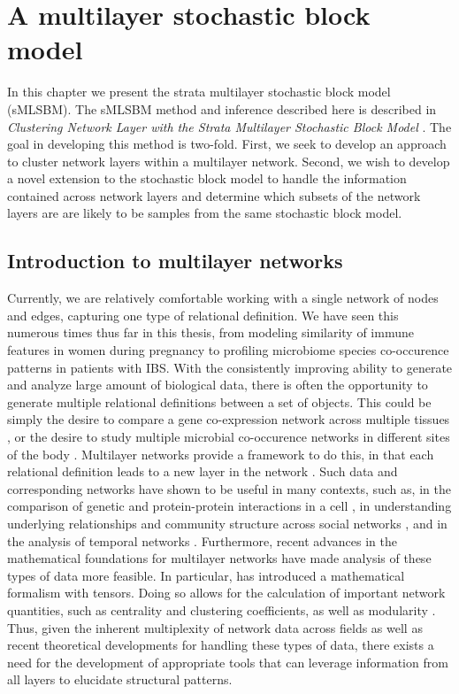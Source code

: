 


\chapter{A multilayer stochastic block model}
In this chapter we present the strata multilayer stochastic block model (sMLSBM). The sMLSBM method and inference described here is described in \emph{Clustering Network Layer with the Strata Multilayer Stochastic Block Model} \cite{smlsbm}. The goal in developing this method is two-fold. First, we seek to develop an approach to cluster network layers within a multilayer network. Second, we wish to develop a novel extension to the stochastic block model to handle the information contained across network layers and determine which subsets of the network layers are are likely to be samples from the same stochastic block model. 

\section{Introduction to multilayer networks}
Currently, we are relatively comfortable working with a single network of nodes and edges, capturing one type of relational definition. We have seen this numerous times thus far in this thesis, from modeling similarity of immune features in women during pregnancy to profiling microbiome species co-occurence patterns in patients with IBS. With the consistently improving ability to generate and analyze large amount of biological data, there is often the opportunity to generate multiple relational definitions between a set of objects. This could be simply the desire to compare a gene co-expression network across multiple tissues \cite{ohmNet}, or the desire to study multiple microbial co-occurence networks in different sites of the body \cite{microbiome}. Multilayer networks provide a framework to do this, in that each relational definition leads to a new layer in the network \cite{kivelamultilayer,boccaletti2014structure,manlioMathFoundations}.  Such data and corresponding networks have shown to be useful in many contexts, such as, in the comparison of genetic and protein-protein interactions in a cell \cite{genetic}, in understanding underlying relationships and community structure across social networks \cite{socialnetwork}, and in the analysis of temporal networks \cite{muchamultislice}. Furthermore, recent advances in the mathematical foundations for multilayer networks have made analysis of these types of data more feasible. In particular, \cite{manlioMathFoundations} has introduced a mathematical formalism with tensors. Doing so allows for the calculation of important network quantities, such as centrality and clustering coefficients, as well as modularity \cite{muchamultislice}. Thus, given the inherent multiplexity of network data across fields as well as recent theoretical developments for handling these types of data, there exists a need for the development of appropriate tools that can leverage information from all layers to elucidate structural patterns.

